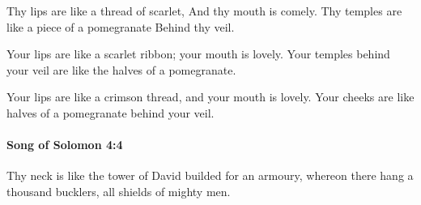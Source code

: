 			\begin{versebox}
					\item[BHS] 
					\item[LXX] 
					\item[ASV] Thy lips are like a thread of scarlet, And thy mouth is comely. Thy temples are like a piece of a pomegranate Behind thy veil.
					\item[NIV] Your lips are like a scarlet ribbon; your mouth is lovely. Your temples behind your veil are like the halves of a pomegranate.
					\item[NRSV] Your lips are like a crimson thread, and your mouth is lovely. Your cheeks are like halves of a pomegranate behind your veil.
			\end{versebox}

		\paragraph{Song of Solomon 4:4} %
			\label{SONGOFSOLOMON-4-4}

			Thy neck is like the tower of David builded for an armoury, whereon there hang a thousand bucklers, all shields of mighty men.

